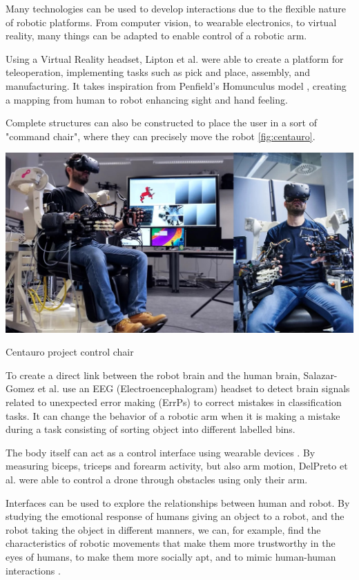 Many technologies can be used to develop interactions due to the flexible nature of robotic platforms. From computer vision, to wearable electronics, to virtual reality, many things can be adapted to enable control of a robotic arm.

Using a Virtual Reality headset, Lipton et al. \cite{robot_control_vr} were able to create a platform for teleoperation, implementing tasks such as pick and place, assembly, and manufacturing. It takes inspiration from Penfield's Homunculus model \cite{penfield1950cerebral}, creating a mapping from human to robot enhancing sight and hand feeling.

Complete structures can also be constructed to place the user in a sort of "command chair", where they can precisely move the robot \cite{centauro} \ref{fig:centauro}.

\begin{marginfigure}
    \centering
    \includegraphics{images/centauro.png}
    \caption{Centauro project control chair}
    \label{fig:centauro}
\end{marginfigure}

To create a direct link between the robot brain and the human brain, Salazar-Gomez et al. \cite{robot_control_eeg} use an EEG (Electroencephalogram) headset to detect brain signals related to unexpected error making (ErrPs) to correct mistakes in classification tasks. It can change the behavior of a robotic arm when it is making a mistake during a task consisting of sorting object into different labelled bins.

The body itself can act as a control interface using wearable devices \cite{robot_gesture_control_wearable}. By measuring biceps, triceps and forearm activity, but also arm motion, DelPreto et al. were able to control a drone through obstacles using only their arm.

Interfaces can be used to explore the relationships between human and robot. By studying the emotional response of humans giving an object to a robot, and the robot taking the object in different manners, we can, for example, find the characteristics of robotic movements that make them more trustworthy in the eyes of humans, to make them more socially apt, and to mimic human-human interactions \cite{robot_handoff}.

